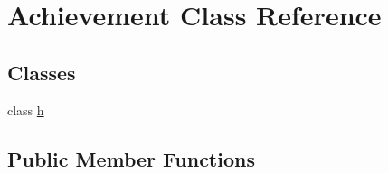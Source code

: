 \hypertarget{class_achievement}{}\section{Achievement Class Reference}
\label{class_achievement}
\subsection*{Classes}
\begin{DoxyCompactItemize}
\item 
class \hyperlink{class_achievement_1_1h}{h}
\end{DoxyCompactItemize}
\subsection*{Public Member Functions}
